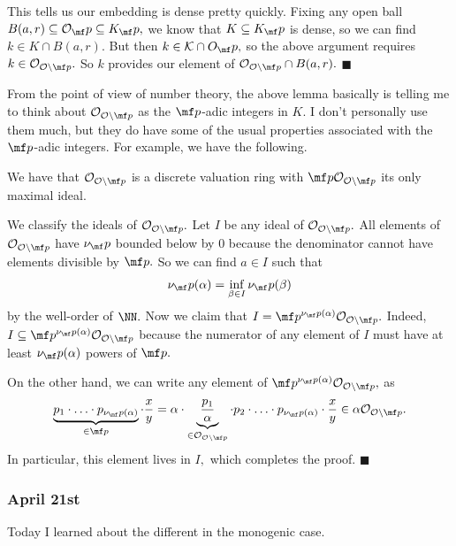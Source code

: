 This tells us our embedding is dense pretty quickly. Fixing any open ball $B(a,r)\subseteq\mathcal O_\mf p\subseteq K_\mf p,$ we know that $K\subseteq K_\mf p$ is dense, so we can find $k\in K\cap B(a,r).$ But then $k\in\mathcal K\cap O_\mf p,$ so the above argument requires $k\in\mathcal O_{\mathcal O\setminus\mf p}.$ So $k$ provides our element of $\mathcal O_{\mathcal O\setminus\mf p}\cap B(a,r).$ $\blacksquare$

From the point of view of number theory, the above lemma basically is telling me to think about $\mathcal O_{\mathcal O\setminus\mf p}$ as the $\mf p$-adic integers in $K.$ I don't personally use them much, but they do have some of the usual properties associated with the $\mf p$-adic integers. For example, we have the following.
\begin{proposition}
    We have that $\mathcal O_{\mathcal O\setminus\mf p}$ is a discrete valuation ring with $\mf p\mathcal O_{\mathcal O\setminus\mf p}$ its only maximal ideal.
\end{proposition}
We classify the ideals of $\mathcal O_{\mathcal O\setminus\mf p}.$ Let $I$ be any ideal of $\mathcal O_{\mathcal O\setminus\mf p}.$ All elements of $\mathcal O_{\mathcal O\setminus\mf p}$ have $\nu_\mf p$ bounded below by $0$ because the denominator cannot have elements divisible by $\mf p.$ So we can find $a\in I$ such that
\[\nu_\mf p(\alpha)=\inf_{\beta\in I}\nu_\mf p(\beta)\]
by the well-order of $\NN.$ Now we claim that $I=\mf p^{\nu_\mf p(\alpha)}\mathcal O_{\mathcal O\setminus\mf p}.$ Indeed, $I\subseteq\mf p^{\nu_\mf p(\alpha)}\mathcal O_{\mathcal O\setminus\mf p}$ because the numerator of any element of $I$ must have at least $\nu_\mf p(\alpha)$ powers of $\mf p.$

On the other hand, we can write any element of $\mf p^{\nu_\mf p(\alpha)}\mathcal O_{\mathcal O\setminus\mf p},$ as
\[\underbrace{p_1\cdot\ldots\cdot p_{\nu_\mf p(\alpha)}}_{\in\mf p}\cdot\frac xy=\alpha\cdot\underbrace{\frac{p_1}{\alpha}}_{\in\mathcal O_{\mathcal O\setminus\mf p}}\cdot p_2\cdot\ldots\cdot p_{\nu_\mf p(\alpha)}\cdot\frac xy\in\alpha\mathcal O_{\mathcal O\setminus\mf p}.\]
In particular, this element lives in $I,$ which completes the proof. $\blacksquare$

\subsubsection{April 21st}
Today I learned about the different in the monogenic case.\todo{}

